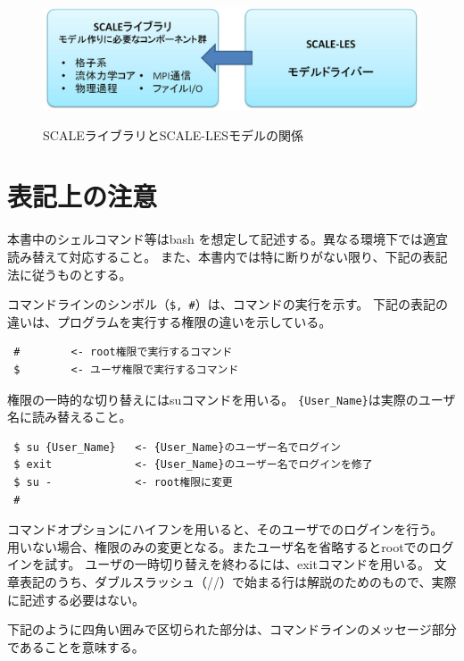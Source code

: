 \begin{figure}[t]
\begin{center}
  \includegraphics[width=0.9\hsize]{./figure/scale_and_scale-les.eps}\\
  \caption{SCALEライブラリとSCALE-LESモデルの関係}
  \label{fig:scale-les}
\end{center}
\end{figure}


\section{表記上の注意}

本書中のシェルコマンド等はbash を想定して記述する。異なる環境下では適宜読み替えて対応すること。
また、本書内では特に断りがない限り、下記の表記法に従うものとする。


コマンドラインのシンボル（\verb|$, #|）は、コマンドの実行を示す。
下記の表記の違いは、プログラムを実行する権限の違いを示している。

\begin{verbatim}
 #        <- root権限で実行するコマンド
 $        <- ユーザ権限で実行するコマンド
\end{verbatim}
権限の一時的な切り替えにはsuコマンドを用いる。
\verb|{User_Name}|は実際のユーザ名に読み替えること。
\begin{verbatim}
 $ su {User_Name}   <- {User_Name}のユーザー名でログイン
 $ exit             <- {User_Name}のユーザー名でログインを修了
 $ su -             <- root権限に変更
 #
\end{verbatim}

コマンドオプションにハイフンを用いると、そのユーザでのログインを行う。
用いない場合、権限のみの変更となる。またユーザ名を省略するとrootでのログインを試す。
ユーザの一時切り替えを終わるには、exitコマンドを用いる。
文章表記のうち、ダブルスラッシュ（//）で始まる行は解説のためのもので、実際に記述する必要はない。

下記のように四角い囲みで区切られた部分は、コマンドラインのメッセージ部分であることを意味する。\\
{\small {\gt
{}}}\\

